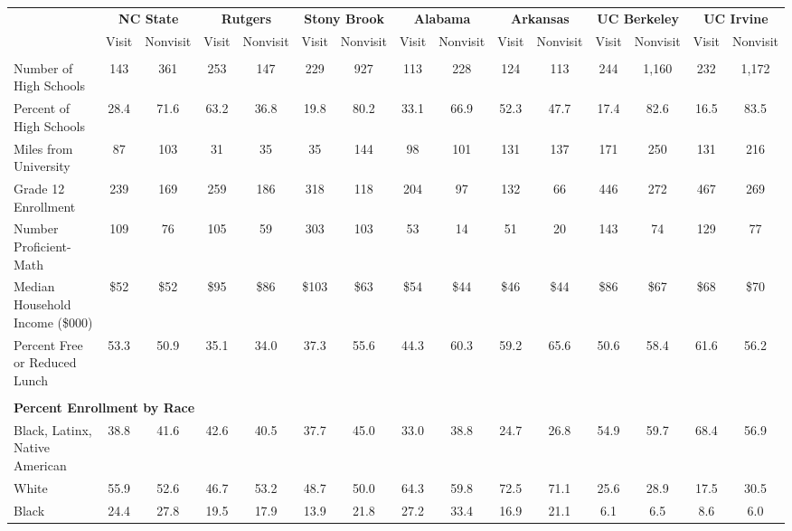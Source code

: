 \begin{tabular*}{\linewidth}{@{\extracolsep{\fill} } lcccccccccccccc}%
&\multicolumn{2}{c}{\bfseries NC State}&\multicolumn{2}{c}{\bfseries Rutgers}&\multicolumn{2}{c}{\bfseries Stony Brook}&\multicolumn{2}{c}{\bfseries Alabama}&\multicolumn{2}{c}{\bfseries Arkansas}&\multicolumn{2}{c}{\bfseries UC Berkeley}&\multicolumn{2}{c}{\bfseries UC Irvine}\\%
&Visit&\multicolumn{1}{l}{Nonvisit}&Visit&\multicolumn{1}{l}{Nonvisit}&Visit&\multicolumn{1}{l}{Nonvisit}&Visit&\multicolumn{1}{l}{Nonvisit}&Visit&\multicolumn{1}{l}{Nonvisit}&Visit&\multicolumn{1}{l}{Nonvisit}&Visit&\multicolumn{1}{l}{Nonvisit}\\%
\hline%
&&&&&&&&&&&&&&\\%
\hspace{0cm}Number of High Schools&143&361&253&147&229&927&113&228&124&113&244&1,160&232&1,172\\%
Percent of High Schools&28.4&71.6&63.2&36.8&19.8&80.2&33.1&66.9&52.3&47.7&17.4&82.6&16.5&83.5\\%
\hspace{0cm}Miles from University&87&103&31&35&35&144&98&101&131&137&171&250&131&216\\%
\hspace{0cm}Grade 12 Enrollment&239&169&259&186&318&118&204&97&132&66&446&272&467&269\\%
\hspace{0cm}Number Proficient{-}Math&109&76&105&59&303&103&53&14&51&20&143&74&129&77\\%
\hspace{0cm}Median Household Income (\$000)&\$52&\$52&\$95&\$86&\$103&\$63&\$54&\$44&\$46&\$44&\$86&\$67&\$68&\$70\\%
\hspace{0cm}Percent Free or Reduced Lunch&53.3&50.9&35.1&34.0&37.3&55.6&44.3&60.3&59.2&65.6&50.6&58.4&61.6&56.2\\%
&&&&&&&&&&&&&&\\%
\multicolumn{15}{l}{\bfseries Percent Enrollment by Race}\\%
\hspace{0.2cm}Black, Latinx, Native American&38.8&41.6&42.6&40.5&37.7&45.0&33.0&38.8&24.7&26.8&54.9&59.7&68.4&56.9\\%
\hspace{0.2cm}White&55.9&52.6&46.7&53.2&48.7&50.0&64.3&59.8&72.5&71.1&25.6&28.9&17.5&30.5\\%
\hspace{0.2cm}Black&24.4&27.8&19.5&17.9&13.9&21.8&27.2&33.4&16.9&21.1&6.1&6.5&8.6&6.0\\%

\end{tabular*}
